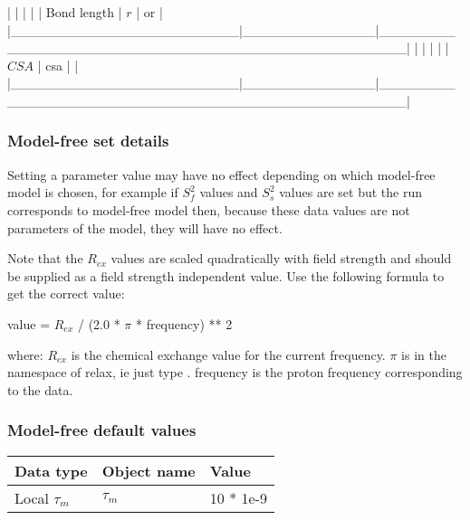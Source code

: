 |                        |              |                                                  |
| Bond length            | $r$            | 
 or 
                 |
|\_\_\_\_\_\_\_\_\_\_\_\_\_\_\_\_\_\_\_\_\_\_\_\_|\_\_\_\_\_\_\_\_\_\_\_\_\_\_|\_\_\_\_\_\_\_\_\_\_\_\_\_\_\_\_\_\_\_\_\_\_\_\_\_\_\_\_\_\_\_\_\_\_\_\_\_\_\_\_\_\_\_\_\_\_\_\_\_\_|
|                        |              |                                                  |
| $CSA$                    | csa          | 
                                 |
|\_\_\_\_\_\_\_\_\_\_\_\_\_\_\_\_\_\_\_\_\_\_\_\_|\_\_\_\_\_\_\_\_\_\_\_\_\_\_|\_\_\_\_\_\_\_\_\_\_\_\_\_\_\_\_\_\_\_\_\_\_\_\_\_\_\_\_\_\_\_\_\_\_\_\_\_\_\_\_\_\_\_\_\_\_\_\_\_\_|



\subsubsection{Model-free set details}

Setting a parameter value may have no effect depending on which model-free model is chosen,
for example if $S^2_f$ values and $S^2_s$ values are set but the run corresponds to model-free model
 then, because these data values are not parameters of the model, they will have no
effect.

Note that the $R_{ex}$ values are scaled quadratically with field strength and should be supplied
as a field strength independent value.  Use the following formula to get the correct value:

    value = $R_{ex}$ / (2.0 * $\pi$ * frequency) ** 2

where:
    $R_{ex}$ is the chemical exchange value for the current frequency.
    $\pi$ is in the namespace of relax, ie just type 
.
    frequency is the proton frequency corresponding to the data.


\subsubsection{Model-free default values}



\begin{center}
\begin{tabular}{lll}
\toprule
Data type & Object name & Value \\
\midrule
Local $\tau_m$ & $\tau_m$ & 10 * 1e-9 \\
\bottomrule
\end{tabular}
\end{center}

